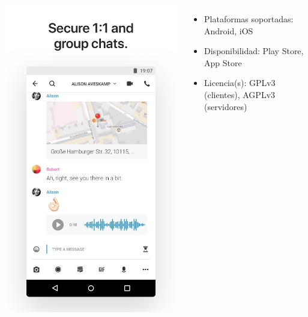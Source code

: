 \begin{frame}
\begin{columns}[c]
\begin{center}
                \includegraphics[height=0.5\textheight]{images/wire-screencap.jpg}
            \end{center}
            \begin{itemize}
                \item Plataformas soportadas: Android, iOS
                \item Disponibilidad: Play Store, App Store
                \item Licencia(s): GPLv3 (clientes), AGPLv3 (servidores)
            \end{itemize}
    \end{columns}

\end{frame}

